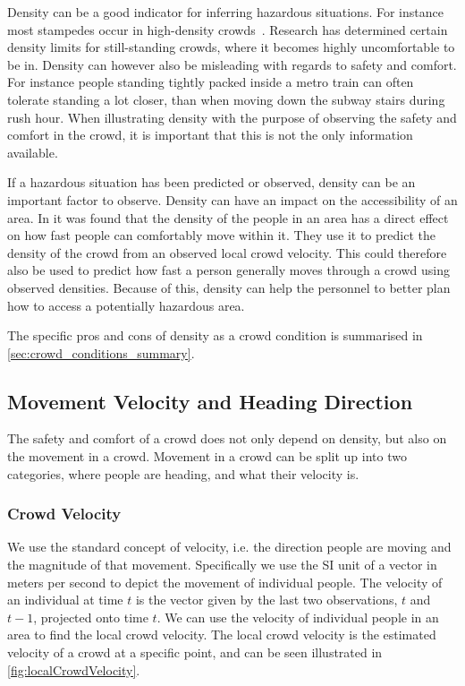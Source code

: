 Density can be a good indicator for inferring hazardous situations. For instance most stampedes occur in high-density crowds~\cite{wirz2012inferring}. Research has determined  certain density limits for still-standing crowds, where it becomes highly uncomfortable to be in. 
Density can however also be misleading with regards to safety and comfort. For instance people standing tightly packed inside a metro train can often tolerate standing a lot closer, than when moving down the subway stairs during rush hour. When illustrating density with the purpose of observing the safety and comfort in the crowd, it is important that this is not the only information available.

If a hazardous situation has been predicted or observed, density can be an important factor to observe. Density can have an impact on the accessibility of an area. In \citet{wirz2013probing} it was found that the density of the people in an area has a direct effect on how fast people can comfortably move within it. They use it to predict the density of the crowd from an observed local crowd velocity. This could therefore also be used to predict how fast a person generally moves through a crowd using observed densities. Because of this, density can help the personnel to better plan how to access a potentially hazardous area.

The specific pros and cons of density as a crowd condition is summarised in \cref{sec:crowd_conditions_summary}.

\subsection{Movement Velocity and Heading Direction}
The safety and comfort of a crowd does not only depend on density, but also on the movement in a crowd. Movement in a crowd can be split up into two categories, where people are heading, and what their velocity is.

\subsubsection{Crowd Velocity}
We use the standard concept of velocity, i.e. the direction people are moving and the magnitude of that movement. Specifically we use the SI unit of a vector in meters per second to depict the movement of individual people. The velocity of an individual at time $t$ is the vector given by the last two observations, $t$ and $t-1$, projected onto time $t$. We can use the velocity of individual people in an area to find the local crowd velocity. The local crowd velocity is the estimated velocity of a crowd at a specific point, and can be seen illustrated in \cref{fig:localCrowdVelocity}.

